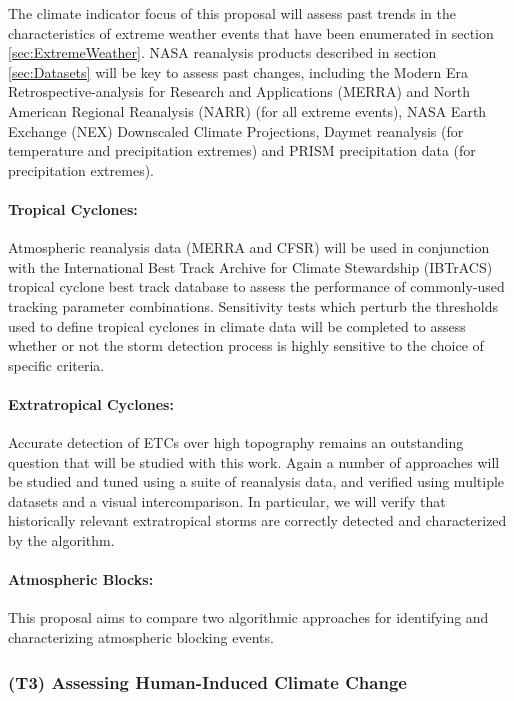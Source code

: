 \documentclass[11pt]{article}
\begin{document}
The climate indicator focus of this proposal will assess past trends in the characteristics of extreme weather events that have been enumerated in section \ref{sec:ExtremeWeather}.  NASA reanalysis products described in section \ref{sec:Datasets} will be key to assess past changes, including the Modern Era Retrospective-analysis for Research and Applications (MERRA) and North American Regional Reanalysis (NARR) (for all extreme events), NASA Earth Exchange (NEX) Downscaled Climate Projections, Daymet reanalysis (for temperature and precipitation extremes) and PRISM precipitation data (for precipitation extremes).

\paragraph{Tropical Cyclones:}  Atmospheric reanalysis data (MERRA and CFSR) will be used in conjunction with the International Best Track Archive for Climate Stewardship (IBTrACS) tropical cyclone best track database \citep{Knapp2010} to assess the performance of commonly-used tracking parameter combinations. Sensitivity tests which perturb the thresholds used to define tropical cyclones in climate data will be completed to assess whether or not the storm detection process is highly sensitive to the choice of specific criteria.

\paragraph{Extratropical Cyclones:}  Accurate detection of ETCs over high topography remains an outstanding question that will be studied with this work.  Again a number of approaches will be studied and tuned using a suite of reanalysis data, and verified using multiple datasets and a visual intercomparison.  In particular, we will verify that historically relevant extratropical storms are correctly detected and characterized by the algorithm.

\paragraph{Atmospheric Blocks:}  This proposal aims to compare two algorithmic approaches for identifying and characterizing atmospheric blocking events.


\subsubsection{(T3) Assessing Human-Induced Climate Change}
\end{document}
